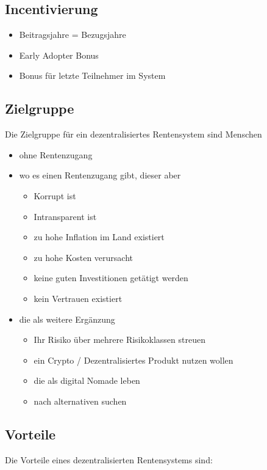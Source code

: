 \subsection{Incentivierung}

\begin{itemize}
\item Beitragsjahre = Bezugsjahre
\item Early Adopter Bonus
\item Bonus für letzte Teilnehmer im System
\end{itemize}


\subsection{Zielgruppe}

Die Zielgruppe für ein dezentralisiertes Rentensystem sind Menschen

\begin{itemize}
\item ohne Rentenzugang
\item wo es einen Rentenzugang gibt, dieser aber 
 \begin{itemize}
 \item Korrupt ist
 \item Intransparent ist
 \item zu hohe Inflation im Land existiert
 \item zu hohe Kosten verursacht
 \item keine guten Investitionen getätigt werden
 \item kein Vertrauen existiert
 \end{itemize}
\item die als weitere Ergänzung 
 \begin{itemize}
 \item Ihr Risiko über mehrere Risikoklassen streuen
 \item ein Crypto / Dezentralisiertes Produkt nutzen wollen
 \item die als digital Nomade leben
 \item nach alternativen suchen
 \end{itemize}
\end{itemize}

\subsection{Vorteile}

Die Vorteile eines dezentralisierten Rentensystems sind:


